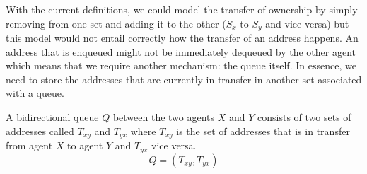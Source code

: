 \documentclass[a4paper,11pt,twoside]{report}
\begin{document}
	With the current definitions, we could model the transfer of ownership by simply removing from one
	set and adding it to the other ($S_x$ to $S_y$ and vice versa) but this model would not 
	entail correctly how the transfer of an address happens. An address that is enqueued might
	not be immediately dequeued by the other agent which means that we require another mechanism: 
	the queue itself. In essence, we need to store
	the addresses that are currently in transfer in another set associated with a queue.
	\\
	\begin{defi}[Queue]
		A bidirectional queue $Q$ between the two agents $X$ and $Y$ consists of two sets of addresses called 
		$T_{xy}$ and $T_{yx}$ where $T_{xy}$ is the set of addresses that is in transfer from agent $X$ 
		to agent $Y$ and $T_{yx}$ vice versa. 
		\[Q = (T_{xy}, T_{yx})\]
	\end{defi}
	
\end{document}
